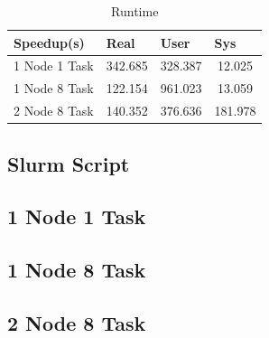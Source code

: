 \documentclass[11pt]{article}
\begin{document}
\begin{table}[]
\begin{tabular}{c|ccc}
\multicolumn{1}{l|}{Speedup(s)} & \multicolumn{1}{l}{Real} & \multicolumn{1}{l}{User} & \multicolumn{1}{l}{Sys} \\ \hline
1 Node 1 Task                   & 342.685                  & 328.387                  & 12.025                  \\ \hline
1 Node 8 Task                   & 122.154                  & 961.023                  & 13.059                  \\ \hline
2 Node 8 Task                   & 140.352                  & 376.636                  & 181.978
\end{tabular}
\caption{Runtime}
\label{Runtime}
\end{table}










\begin{appendices}
\appendixpage
\section{Slurm Script}
\subsection{1 Node 1 Task}

\subsection{1 Node 8 Task}

\subsection{2 Node 8 Task}

\end{appendices}
\end{document}
